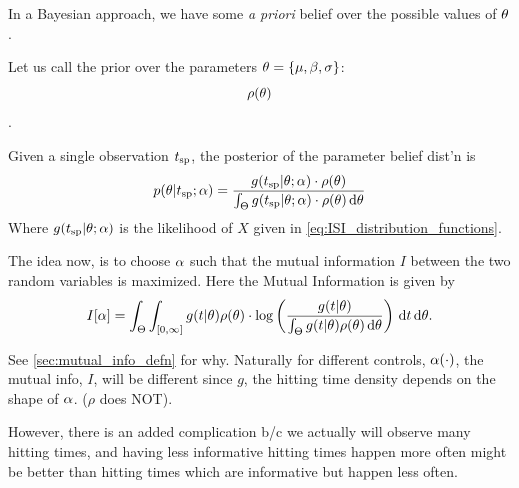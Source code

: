 \documentclass{article}
\begin{document}
% 
% 
% 

In a Bayesian approach, we have some {\sl a priori} belief over the possible
values of ${\theta}$.

Let us call the prior over the parameters ${\theta} = \{{\mu }, {\beta}, {\sigma }\}$:
$$\rho({\theta})$$.

Given a single observation ${ t_{\textrm{sp} } }$, the posterior of the parameter belief dist'n
is 
\begin{equation}
p({\theta}| { t_{\textrm{sp} } }; {\alpha}) =
\frac{g({ t_{\textrm{sp} } } |{\theta}; {\alpha})\cdot \rho({\theta})}{\int_\Theta g({ t_{\textrm{sp} } }|{\theta}; {\alpha})\cdot \rho({\theta})
\, \mathrm{d} {\theta}}
\label{eq:parameter_posterior_defn}
\end{equation} 
Where $ g( { t_{\textrm{sp} } } |{\theta}; {\alpha})$ is the likelihood of $X$ given in
\cref{eq:ISI_distribution_functions}.

The idea now, is to choose ${\alpha}$ such that the mutual information $I$ between the
two random variables is maximized. Here the Mutual Information is given by
\begin{equation}
I[{\alpha}]= 
\int_\Theta \int_{[0, \infty]} g(t|{\theta})\rho({\theta}) \cdot 
\log \left( \frac{g(t|{\theta})}
{\int_\Theta g(t|{\theta})\rho({\theta}) \, \mathrm{d} {\theta}   } \right)
\, \mathrm{d} t\, \mathrm{d} {\theta}.
\label{eq:J_mutual_info_objective}
\end{equation}

See \cref{sec:mutual_info_defn} for why. 
Naturally for different controls, ${\alpha}(\cdot)$, the mutual info, $I$, will
be different since $g$, the hitting time density depends on the shape of ${\alpha}$.
($\rho$ does NOT).

However, there is an added complication b/c we actually will observe many
hitting times, and having less informative hitting times happen more often might
be better than hitting times which are informative but happen less often. 
\end{document}

